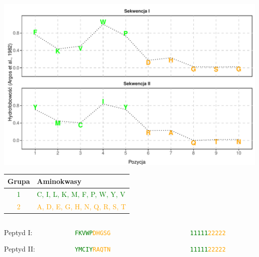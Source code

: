 \documentclass{beamer}\usepackage[]{graphicx}\usepackage[]{color}
\makeatletter
\def\maxwidth{ %
  \ifdim\Gin@nat@width>\linewidth
    \linewidth
  \else
    \Gin@nat@width
  \fi
}
\makeatother
\begin{document}
\begin{frame}

\includegraphics[width=\maxwidth]{figure/unnamed-chunk-2-1} 


\end{frame}  

\begin{frame}
\begin{table}
\begin{tabular}{cl}
\toprule
Grupa & Aminokwasy \\ 
\midrule
 \textcolor{green}{1} & \textcolor{green}{C, I, L, K, M, F, P, W, Y, V} \\ 
 \textcolor{orange}{2} & \textcolor{orange}{A, D, E, G, H, N, Q, R, S, T} \\ 
\bottomrule
\end{tabular}
\end{table}

\begin{columns}
\begin{column}{0.15\textwidth}
 
Peptyd I: 

Peptyd II: 

\end{column}
\begin{column}{0.1\textwidth}

\texttt{\textcolor{green}{FKVWP}}\texttt{\textcolor{orange}{DHGSG}} 

\texttt{\textcolor{green}{YMCIY}}\texttt{\textcolor{orange}{RAQTN}} 

\end{column}
\begin{column}{0.02\textwidth}  %

\textrightarrow

\textrightarrow
\end{column}
\begin{column}{0.1\textwidth}  %

\texttt{\textcolor{green}{11111}}\texttt{\textcolor{orange}{22222}}

\texttt{\textcolor{green}{11111}}\texttt{\textcolor{orange}{22222}}
\end{column}
\end{columns}
\end{frame}  
\end{document}
